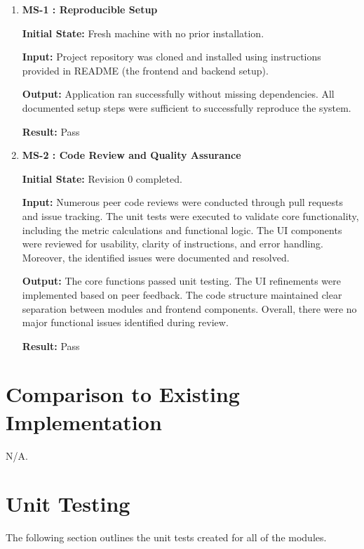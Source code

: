 \documentclass[12pt, titlepage]{article}
\begin{document}
\begin{enumerate}

\item \textbf{MS-1 : Reproducible Setup}

\textbf{Initial State:} Fresh machine with no prior installation.

\textbf{Input:} Project repository was cloned and installed using instructions provided in README 
(the frontend and backend setup).

\textbf{Output:} Application ran successfully without missing dependencies. All documented setup steps were 
sufficient to successfully reproduce the system.

\textbf{Result:} Pass

\vspace{0.5em}

\item \textbf{MS-2 : Code Review and Quality Assurance}

\textbf{Initial State:} Revision 0 completed.

\textbf{Input:} Numerous peer code reviews were conducted through pull requests and issue tracking. 
The unit tests were executed to validate core functionality, including the metric calculations and functional logic. 
The UI components were reviewed for usability, clarity of instructions, and error handling. Moreover, the identified 
issues were documented and resolved.

\textbf{Output:} The core functions passed unit testing. The UI refinements were implemented based on peer 
feedback. The code structure maintained clear separation between modules and frontend components. Overall, there 
were no major functional issues identified during review.

\textbf{Result:} Pass

\end{enumerate}
	
\section{Comparison to Existing Implementation}	

N/A.

\section{Unit Testing}

The following section outlines the unit tests created for all of the
modules.
\end{document}
